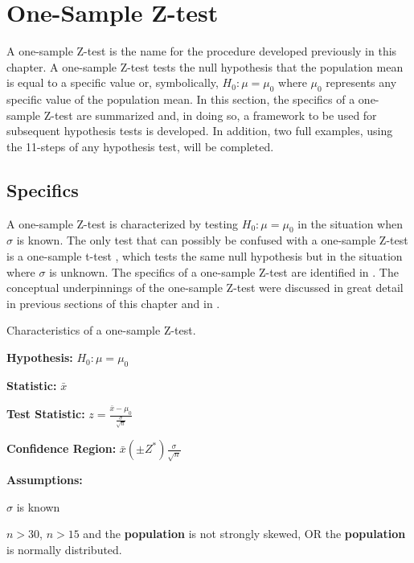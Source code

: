 \documentclass[10pt,openany]{book}\usepackage[]{graphicx}\usepackage[]{color}
\begin{document}
\vspace{-12pt}


\section{One-Sample Z-test} \label{sect:ZTest}
A one-sample Z-test is the name for the procedure developed previously in this chapter.  A one-sample Z-test tests the null hypothesis that the population mean is equal to a specific value or, symbolically, $H_{0}:\mu=\mu_{0}$ where $\mu_{0}$ represents any specific value of the population mean.  In this section, the specifics of a one-sample Z-test are summarized and, in doing so, a framework to be used for subsequent hypothesis tests is developed.  In addition, two full examples, using the 11-steps of any hypothesis test, will be completed.

\subsection{Specifics}
A one-sample Z-test is characterized by testing $H_{0}:\mu=\mu_{0}$ in the situation when $\sigma$ is known.  The only test that can possibly be confused with a one-sample Z-test is a one-sample t-test , which tests the same null hypothesis but in the situation where $\sigma$ is unknown.  The specifics of a one-sample Z-test are identified in .  The conceptual underpinnings of the one-sample Z-test were discussed in great detail in previous sections of this chapter and in .

\begin{table}[htbp]
  \caption{Characteristics of a one-sample Z-test.}
  \label{tab:1Zspec}
    \begin{Itemize}
      \item \textbf{Hypothesis:} $H_{0}:\mu=\mu_{0}$
      \item \textbf{Statistic:} $\bar{x}$
      \vspace{6pt}
      \item \textbf{Test Statistic:} $z=\frac{\bar{x}-\mu_{0}}{\frac{\sigma}{\sqrt{n}}}$
      \vspace{6pt}
      \item \textbf{Confidence Region:} $\bar{x} (\pm Z^{*})\frac{\sigma}{\sqrt{n}}$
      \vspace{6pt}
      \item \textbf{Assumptions:}
        \begin{Enumerate}
          \item $\sigma$ is known
          \item $n>30$, $n>15$ and the \textbf{population} is not strongly skewed, OR the \textbf{population} is normally distributed.
        \end{Enumerate}
    \end{Itemize}
\end{table}
\end{document}
